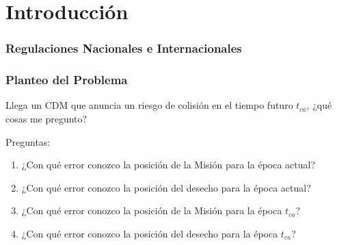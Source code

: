 \chapter{Introducción}
\label{chap:introduccion}


\subsection{Regulaciones Nacionales e Internacionales}



\subsection{Planteo del Problema}
Llega un CDM que anuncia un riesgo de colisi\'on en el tiempo futuro $t_{ca}$, ¿qu\'e cosas me pregunto?

Preguntas:\\

\begin{enumerate}
 \item ¿Con qu\'e error conozco la posici\'on de la Misi\'on para la \'epoca actual?\\
 \item ¿Con qu\'e error conozco la posici\'on del desecho para la \'epoca actual?\\
 \item ¿Con qu\'e error conozco la posici\'on de la Misi\'on para la \'epoca $t_{ca}$?\\
 \item ¿Con qu\'e error conozco la posici\'on del desecho para la \'epoca $t_{ca}$?\\
\end{enumerate}



